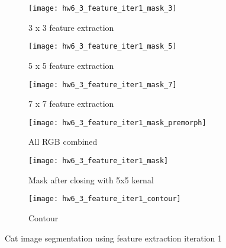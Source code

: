 \documentclass[11pt]{article}
\begin{document}
\begin{figure}[H]
\begin{subfigure}{.5\textwidth}
  \centering
  \texttt{[image: hw6\_3\_feature\_iter1\_mask\_3]}
  \caption{3 x 3 feature extraction}
  \label{}
\end{subfigure}
\begin{subfigure}{.5\textwidth}
  \centering
  \texttt{[image: hw6\_3\_feature\_iter1\_mask\_5]}
  \caption{5 x 5 feature extraction}
  \label{}
\end{subfigure}

\begin{subfigure}{.5\textwidth}
  \centering
  \texttt{[image: hw6\_3\_feature\_iter1\_mask\_7]}
  \caption{7 x 7 feature extraction}
  \label{}
\end{subfigure}
\begin{subfigure}{.5\textwidth}
  \centering
  \texttt{[image: hw6\_3\_feature\_iter1\_mask\_premorph]}
  \caption{All RGB combined}
  \label{}
\end{subfigure}

\begin{subfigure}{.5\textwidth}
  \centering
  \texttt{[image: hw6\_3\_feature\_iter1\_mask]}
  \caption{Mask after closing with 5x5 kernal}
  \label{}
\end{subfigure}
\begin{subfigure}{.5\textwidth}
  \centering
  \texttt{[image: hw6\_3\_feature\_iter1\_contour]}
  \caption{Contour}
  \label{}
\end{subfigure}

\caption{Cat image segmentation using feature extraction iteration 1}
\label{}
\end{figure}
\end{document}
